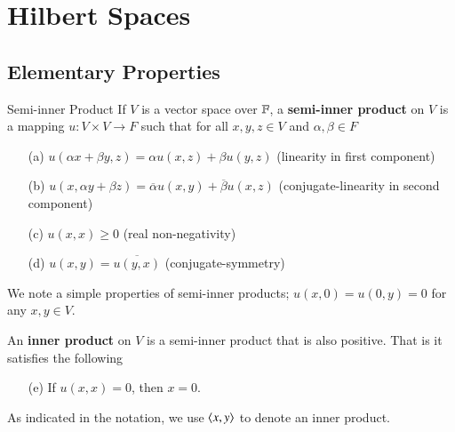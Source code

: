 %
%
%
\chapter{Hilbert Spaces}
\label{Hilb} %




\section{Elementary Properties}
\label{sec:Hilb1}

\begin{ndefn}{Semi-inner Product}
    If $V$ is a vector space over $\mathbb F$, a \textbf{semi-inner product} on $V$ is a mapping $u:V\times V\rightarrow F$ such that for all $x,y,z \in V$ and $\alpha,\beta \in F$ \begin{enumerate}
        \item[(a)] $u(\alpha x+\beta y,z) = \alpha u(x,z)+\beta u(y,z)$ (linearity in first component)
        \item[(b)] $u(x,\alpha y+\beta z) = \overline{\alpha}u(x,y)+\overline{\beta}u(x,z)$ (conjugate-linearity in second component)
        \item[(c)] $u(x,x) \geq 0$ (real non-negativity)
        \item[(d)] $u(x,y) = \overline{u(y,x)}$ (conjugate-symmetry)
    \end{enumerate}
\end{ndefn}

We note a simple properties of semi-inner products; $u(x,0) = u(0,y) = 0$ for any $x,y \in V$. 

An \textbf{inner product} on $V$ is a semi-inner product that is also positive. That is it satisfies the following \begin{enumerate}
    \item[(e)] If $u(x,x) = 0$, then $x = 0$.
\end{enumerate}

As indicated in the notation, we use $\left\langle x, y\right\rangle$ to denote an inner product.

